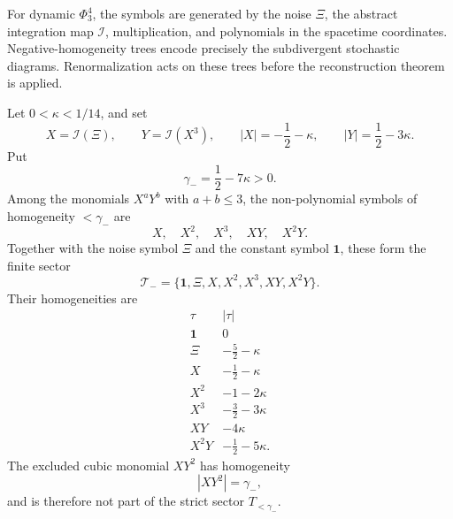For dynamic \(\Phi^4_3\), the symbols are generated by the noise \(\Xi\), the
abstract integration map \(\mathcal I\), multiplication, and polynomials in
the spacetime coordinates.  Negative-homogeneity trees encode precisely the
subdivergent stochastic diagrams.  Renormalization acts on these trees before
the reconstruction theorem is applied.

\begin{lemma}
\label{lem:spde-phi-four-three-negative-sector-coordinate-chart}
Let \(0<\kappa<1/14\), and set
\[
  X=\mathcal I(\Xi),\qquad
  Y=\mathcal I(X^3),\qquad
  |X|=-\frac12-\kappa,\qquad |Y|=\frac12-3\kappa .
\]
Put
\[
  \gamma_-=\frac12-7\kappa>0 .
\]
Among the monomials \(X^aY^b\) with \(a+b\leq3\), the non-polynomial
symbols of homogeneity \(<\gamma_-\) are
\begin{equation}
  X,\quad X^2,\quad X^3,\quad XY,\quad X^2Y .
  \label{eq:spde-negative-sector-monomial-list}
\end{equation}
Together with the noise symbol \(\Xi\) and the constant symbol \(\mathbf 1\),
these form the finite sector
\[
  \mathcal T_-=
  \{\mathbf 1,\Xi,X,X^2,X^3,XY,X^2Y\}.
\]
Their homogeneities are
\[
\begin{array}{c|c}
  \tau & |\tau|\\
  \hline
  \mathbf 1 & 0\\
  \Xi & -\frac52-\kappa\\
  X & -\frac12-\kappa\\
  X^2 & -1-2\kappa\\
  X^3 & -\frac32-3\kappa\\
  XY & -4\kappa\\
  X^2Y & -\frac12-5\kappa .
\end{array}
\]
The excluded cubic monomial \(XY^2\) has homogeneity
\[
  |XY^2|=\gamma_-,
\]
and is therefore not part of the strict sector \(T_{<\gamma_-}\).


\end{lemma}
